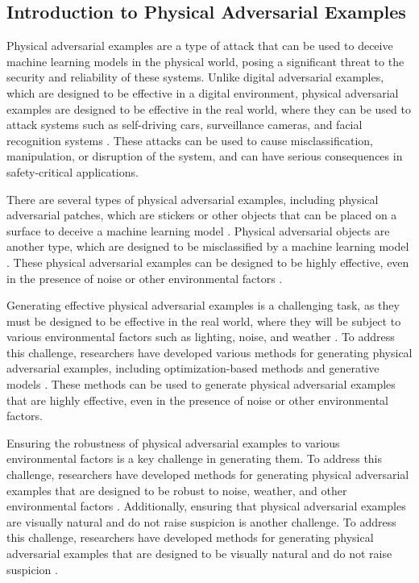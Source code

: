\documentclass[11pt]{article}
\begin{document}
\subsection{Introduction to Physical Adversarial Examples}

Physical adversarial examples are a type of attack that can be used to deceive machine learning models in the physical world, posing a significant threat to the security and reliability of these systems. Unlike digital adversarial examples, which are designed to be effective in a digital environment, physical adversarial examples are designed to be effective in the real world, where they can be used to attack systems such as self-driving cars, surveillance cameras, and facial recognition systems \cite{ref74}. These attacks can be used to cause misclassification, manipulation, or disruption of the system, and can have serious consequences in safety-critical applications.

There are several types of physical adversarial examples, including physical adversarial patches, which are stickers or other objects that can be placed on a surface to deceive a machine learning model \cite{ref75}. Physical adversarial objects are another type, which are designed to be misclassified by a machine learning model \cite{ref76}. These physical adversarial examples can be designed to be highly effective, even in the presence of noise or other environmental factors \cite{ref77}.

Generating effective physical adversarial examples is a challenging task, as they must be designed to be effective in the real world, where they will be subject to various environmental factors such as lighting, noise, and weather \cite{ref63}. To address this challenge, researchers have developed various methods for generating physical adversarial examples, including optimization-based methods and generative models \cite{ref78}. These methods can be used to generate physical adversarial examples that are highly effective, even in the presence of noise or other environmental factors.

Ensuring the robustness of physical adversarial examples to various environmental factors is a key challenge in generating them. To address this challenge, researchers have developed methods for generating physical adversarial examples that are designed to be robust to noise, weather, and other environmental factors \cite{ref79}. Additionally, ensuring that physical adversarial examples are visually natural and do not raise suspicion is another challenge. To address this challenge, researchers have developed methods for generating physical adversarial examples that are designed to be visually natural and do not raise suspicion \cite{ref80}.
\end{document}

